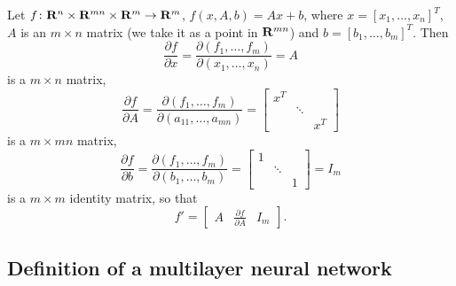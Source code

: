 Let $f \colon \mathbf{R}^n \times \mathbf{R}^{mn} \times \mathbf{R}^m \rightarrow
\mathbf{R}^m$, $f(x, A, b) = Ax + b$, where $x = [x_1, \ldots, x_n]^T$,
$A$ is an $m \times n$ matrix (we take it as a point in $\mathbf{R}^{mn}$)
and $b = [b_1, \ldots, b_m]^T$. Then
\begin{equation} \label{eq:neuralnet_deriv_x}
  \frac{\partial f}{\partial x} = \frac{\partial(f_1, \ldots,
    f_m)}{\partial(x_1, \ldots, x_n)} = A
\end{equation}
is a $m \times n$ matrix,
\begin{equation} \label{eq:neuralnet_deriv_A}
  \frac{\partial f}{\partial A} = \frac{\partial(f_1, \ldots,
    f_m)}{\partial(a_{11}, \ldots, a_{mn})} =
  \begin{bmatrix}
    x^T &        &     \\
        & \ddots &     \\
        &        & x^T
  \end{bmatrix}
\end{equation}
is a $m \times mn$ matrix,
\begin{equation} \label{eq:neuralnet_deriv_b}
  \frac{\partial f}{\partial b} = \frac{\partial(f_1, \ldots,
    f_m)}{\partial(b_1, \ldots, b_m)} =
  \begin{bmatrix}
    1 &        &   \\
      & \ddots &   \\
      &        & 1
  \end{bmatrix} = I_m
\end{equation}
is a $m \times m$ identity matrix, so that
\begin{equation*}
  f' = \begin{bmatrix}
    A & \frac{\partial f}{\partial A} & I_m
  \end{bmatrix}.
\end{equation*}

\subsection{Definition of a multilayer neural network}


